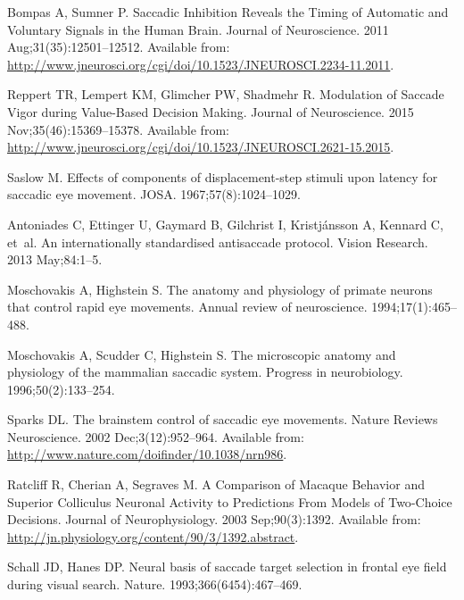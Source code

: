 \documentclass[10pt,letterpaper]{article}
\begin{document}
\begin{thebibliography}{10}
Bompas A, Sumner P.
\newblock Saccadic {Inhibition} {Reveals} the {Timing} of {Automatic} and
  {Voluntary} {Signals} in the {Human} {Brain}.
\newblock Journal of Neuroscience. 2011 Aug;31(35):12501--12512.
\newblock Available from:
  \url{http://www.jneurosci.org/cgi/doi/10.1523/JNEUROSCI.2234-11.2011}.

Reppert TR, Lempert KM, Glimcher PW, Shadmehr R.
\newblock Modulation of {Saccade} {Vigor} during {Value}-{Based} {Decision}
  {Making}.
\newblock Journal of Neuroscience. 2015 Nov;35(46):15369--15378.
\newblock Available from:
  \url{http://www.jneurosci.org/cgi/doi/10.1523/JNEUROSCI.2621-15.2015}.

Saslow M.
\newblock Effects of components of displacement-step stimuli upon latency for
  saccadic eye movement.
\newblock JOSA. 1967;57(8):1024--1029.

Antoniades C, Ettinger U, Gaymard B, Gilchrist I, Kristjánsson A, Kennard C,
  et~al.
\newblock An internationally standardised antisaccade protocol.
\newblock Vision Research. 2013 May;84:1--5.

Moschovakis A, Highstein S.
\newblock The anatomy and physiology of primate neurons that control rapid eye
  movements.
\newblock Annual review of neuroscience. 1994;17(1):465--488.

Moschovakis A, Scudder C, Highstein S.
\newblock The microscopic anatomy and physiology of the mammalian saccadic
  system.
\newblock Progress in neurobiology. 1996;50(2):133--254.

Sparks DL.
\newblock The brainstem control of saccadic eye movements.
\newblock Nature Reviews Neuroscience. 2002 Dec;3(12):952--964.
\newblock Available from: \url{http://www.nature.com/doifinder/10.1038/nrn986}.

Ratcliff R, Cherian A, Segraves M.
\newblock A {Comparison} of {Macaque} {Behavior} and {Superior} {Colliculus}
  {Neuronal} {Activity} to {Predictions} {From} {Models} of {Two}-{Choice}
  {Decisions}.
\newblock Journal of Neurophysiology. 2003 Sep;90(3):1392.
\newblock Available from:
  \url{http://jn.physiology.org/content/90/3/1392.abstract}.

Schall JD, Hanes DP.
\newblock Neural basis of saccade target selection in frontal eye field during
  visual search.
\newblock Nature. 1993;366(6454):467--469.


\end{thebibliography}
\end{document}
